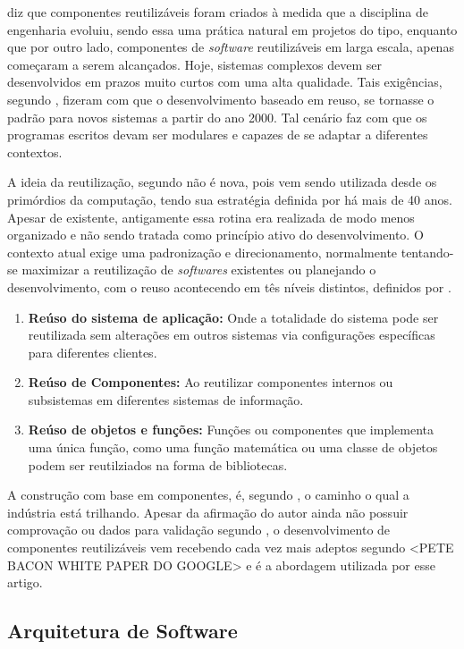 \cite{pressman2011} diz que componentes reutilizáveis foram criados à medida que a disciplina de engenharia evoluiu, sendo essa uma prática natural em projetos do tipo, enquanto que por outro lado, componentes de \textit{software} reutilizáveis em larga escala, apenas começaram a serem alcançados. Hoje, sistemas complexos devem ser desenvolvidos em prazos muito curtos com uma alta qualidade. Tais exigências, segundo \cite{sommer07}, fizeram com que o desenvolvimento baseado em reuso, se tornasse o padrão para novos sistemas a partir do ano 2000. Tal cenário faz com que os programas escritos devam ser modulares e capazes de se adaptar a diferentes contextos.

A ideia da reutilização, segundo \cite{pressman2011} não é nova, pois vem sendo utilizada desde os primórdios da computação, tendo sua estratégia definida por \cite{unixPhilosophy} há mais de 40 anos. Apesar de existente, antigamente essa rotina era realizada de modo menos organizado e não sendo tratada como princípio ativo do desenvolvimento. O contexto atual exige uma padronização e direcionamento, normalmente tentando-se maximizar a reutilização de \textit{softwares} existentes ou planejando o desenvolvimento, com o reuso acontecendo em tês níveis distintos, definidos por \cite{sommer07}.

\begin{enumerate}
	\item \textbf{Reúso do sistema de aplicação:} Onde a totalidade do sistema pode ser reutilizada sem alterações em outros sistemas via configurações específicas para diferentes clientes.
	\item \textbf{Reúso de Componentes:} Ao reutilizar componentes internos ou subsistemas em diferentes sistemas de informação.
	\item \textbf{Reúso de objetos e funções:} Funções ou componentes que implementa uma única função, como uma função matemática ou uma classe de objetos  podem ser reutilziados na forma de bibliotecas. 
\end{enumerate}

A construção com base em componentes, é, segundo \cite{pressman2011}, o caminho o qual a indústria está trilhando. Apesar da afirmação do autor ainda não possuir comprovação ou dados para validação segundo \cite{cbs28}, o desenvolvimento de componentes reutilizáveis vem recebendo cada vez mais adeptos segundo <PETE BACON WHITE PAPER DO GOOGLE>  e é a abordagem utilizada por esse artigo.

\subsection{\esp Arquitetura de Software}

